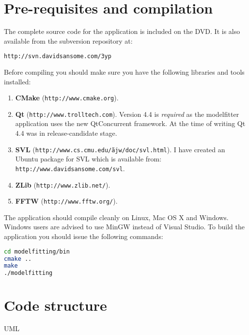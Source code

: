 \section{Pre-requisites and compilation}

The complete source code for the application is included on the DVD.
It is also available from the subversion repository at:

\texttt{http://svn.davidsansome.com/3yp}

\bigskip
\noindent Before compiling you should make sure you have the following libraries and tools installed:

\begin{enumerate}
	\item \textbf{CMake} (\texttt{http://www.cmake.org}).
	\item \textbf{Qt} (\texttt{http://www.trolltech.com}).
		Version 4.4 is \emph{required} as the modelfitter application uses the new QtConcurrent framework.
		At the time of writing Qt 4.4 was in release-candidate stage.
	\item \textbf{SVL} (\texttt{http://www.cs.cmu.edu/\~ajw/doc/svl.html}).
		I have created an Ubuntu package for SVL which is available from: \\
		\texttt{http://www.davidsansome.com/svl}.
	\item \textbf{ZLib} (\texttt{http://www.zlib.net/}).
	\item \textbf{FFTW} (\texttt{http://www.fftw.org/}).
\end{enumerate}

The application should compile cleanly on Linux, Mac OS X and Windows.
Windows users are advised to use MinGW instead of Visual Studio.
To build the application you should issue the following commands:

\begin{lstlisting}[firstnumber=1,language=sh,frame=single,morekeywords={cmake,make}]
cd modelfitting/bin
cmake ..
make
./modelfitting
\end{lstlisting}

\section{Code structure}
UML